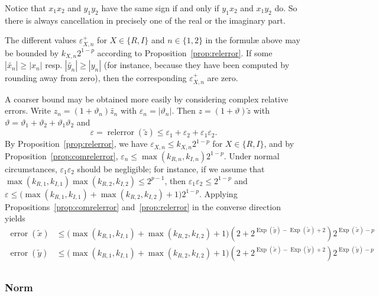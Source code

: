 \documentclass [11pt]{article}
\newcommand {\corr}[1]{{#1}}
\newcommand {\appro}[1]{\widetilde {#1}}
\DeclareMathOperator{\Exp}{\operatorname {Exp}}
\newcommand{\error}{\operatorname {error}}
\newcommand{\relerror}{\operatorname {relerror}}
\renewcommand {\epsilon}{\varepsilon}
\renewcommand {\theta}{\vartheta}
\renewcommand {\leq}{\leqslant}
\renewcommand {\geq}{\geqslant}
\begin{document}
Notice that $x_1 x_2$ and $y_1 y_2$ have the same sign
if and only if $y_1 x_2$ and $x_1 y_2$ do. So there is
always cancellation in precisely one of the real or the imaginary part.

The different values $\epsilon_{X, n}^+$ for $X \in \{ R, I \}$ and
$n \in \{ 1, 2 \}$ in the formul{\ae} above may be bounded by
$k_{X, n} 2^{1 - p}$ according to Proposition~\ref {prop:relerror}.
If some $|\appro {x_n}| \geq |\corr {x_n}|$ resp.
$|\appro {y_n}| \geq |\corr {y_n}|$ (for instance, because they have been
computed by rounding away from zero), then the corresponding
$\epsilon_{X, n}^+$ are zero.


A coarser bound may be obtained more easily by considering complex
relative errors. Write $\corr {z_n} = (1 + \theta_n) \appro {z_n}$
with $\epsilon_n = | \theta_n |$. Then $\corr z = (1 + \theta) \appro z$
with $\theta = \theta_1 + \theta_2 + \theta_1 \theta_2$ and
\begin {equation}
\label {eq:propmulrel}
\epsilon = \relerror (\appro z)
\leq \epsilon_1 + \epsilon_2 + \epsilon_1 \epsilon_2.
\end {equation}
By Proposition~\ref {prop:relerror},
we have $\epsilon_{X, n} \leq k_{X, n} 2^{1-p}$ for $X \in \{ R, I \}$,
and by Proposition~\ref {prop:comrelerror},
$\epsilon_n \leq  \max (k_{R, n}, k_{I, n}) 2^{1 - p}$.
Under normal circumstances, $\epsilon_1 \epsilon_2$ should be negligible;
for instance, if we assume that
$\max (k_{R, 1}, k_{I, 1}) \max (k_{R, 2}, k_{I, 2}) \leq 2^{p - 1}$,
then $\epsilon_1 \epsilon_2 \leq 2^{1-p}$ and
$\epsilon \leq \big( \max (k_{R, 1}, k_{I, 1}) + \max (k_{R, 2}, k_{I, 2}) + 1
\big) 2^{1 - p}$.
Applying Propositions~\ref {prop:comrelerror} and~\ref {prop:relerror}
in the converse direction yields
\begin {equation}
\label {eq:propmulcomrel}
\begin {array}{rl}
\error (\appro x)
&\leq \big( \max (k_{R, 1}, k_{I, 1}) + \max (k_{R, 2}, k_{I, 2}) + 1 \big)
\left( 2 + 2^{\Exp (\appro y) - \Exp (\appro x) + 2} \right)
2^{\Exp (\appro x) - p} \\
\error (\appro y)
&\leq \big( \max (k_{R, 1}, k_{I, 1}) + \max (k_{R, 2}, k_{I, 2}) + 1 \big)
\left( 2 + 2^{\Exp (\appro x) - \Exp (\appro y) + 2} \right)
2^{\Exp (\appro y) - p} \\
\end {array}
\end {equation}


\subsubsection {Norm}
\label {sssec:propnorm}
\end{document}
